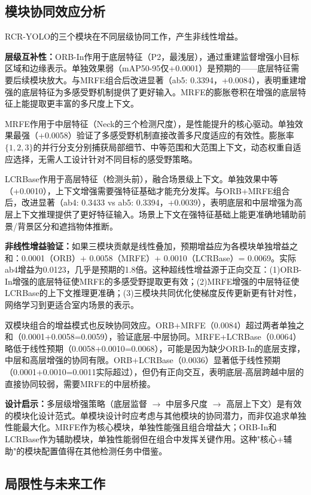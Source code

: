 \documentclass[journal]{IEEEtran}
\begin{document}
\subsection{模块协同效应分析}
\label{subsec:module_synergy}

RCR-YOLO的三个模块在不同层级协同工作，产生非线性增益。

\textbf{层级互补性：}ORB-In作用于底层特征（P2，最浅层），通过重建监督增强小目标区域和边缘表示。单独效果弱（mAP50-95仅+0.0001）是预期的——底层特征需要后续模块放大。与MRFE组合后改进显著（ab5: 0.3394，+0.0084），表明重建增强的底层特征为多感受野机制提供了更好输入。MRFE的膨胀卷积在增强的底层特征上能提取更丰富的多尺度上下文。

MRFE作用于中层特征（Neck的三个检测尺度），是性能提升的核心驱动。单独效果最强（+0.0058）验证了多感受野机制直接改善多尺度适应的有效性。膨胀率$\{1,2,3\}$的并行分支分别捕获局部细节、中等范围和大范围上下文，动态权重自适应选择，无需人工设计针对不同目标的感受野策略。

LCRBase作用于高层特征（检测头前），融合场景级上下文。单独效果中等（+0.0010），上下文增强需要强特征基础才能充分发挥。与ORB+MRFE组合后，改进显著（ab4: 0.3433 vs ab5: 0.3394，+0.0039），表明底层和中层增强为高层上下文推理提供了更好特征输入。场景上下文在强特征基础上能更准确地辅助前景/背景区分和遮挡物体推断。

\textbf{非线性增益验证：}如果三模块贡献是线性叠加，预期增益应为各模块单独增益之和：0.0001（ORB）+ 0.0058（MRFE）+ 0.0010（LCRBase）= 0.0069。实际ab4增益为0.0123，几乎是预期的1.8倍。这种超线性增益源于正向交互：(1)ORB-In增强的底层特征使MRFE的多感受野提取更有效；(2)MRFE增强的中层特征使LCRBase的上下文推理更准确；(3)三模块共同优化使梯度反传更新更有针对性，网络学习到更适合室内场景的表示。

双模块组合的增益模式也反映协同效应。ORB+MRFE（0.0084）超过两者单独之和（0.0001+0.0058=0.0059），验证底层-中层协同。MRFE+LCRBase（0.0064）略低于线性预期（0.0058+0.0010=0.0068），可能是因为缺少ORB-In的底层支撑，中层和高层增强的协同有限。ORB+LCRBase（0.0036）显著低于线性预期（0.0001+0.0010=0.0011实际超过），但仍有正向交互，表明底层-高层跨越中层的直接协同较弱，需要MRFE的中层桥接。

\textbf{设计启示：}多层级增强策略（底层监督 $\rightarrow$ 中层多尺度 $\rightarrow$ 高层上下文）是有效的模块化设计范式。单模块设计时应考虑与其他模块的协同潜力，而非仅追求单独性能最大化。MRFE作为核心模块，单独性能强且组合增益大；ORB-In和LCRBase作为辅助模块，单独性能弱但在组合中发挥关键作用。这种"核心+辅助"的模块配置值得在其他检测任务中借鉴。


\subsection{局限性与未来工作}
\label{subsec:limitations}
\end{document}
